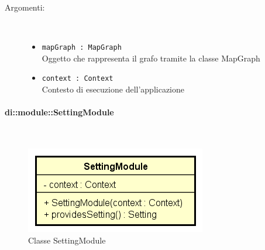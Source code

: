 \documentclass[../DefinizioneDiProdotto.tex]{subfiles}
\begin{document}
\begin{description}
\begin{itemize}
		\begin{description}
			\item[Argomenti:] \
			\begin{itemize}
				\item \texttt{mapGraph : MapGraph}\\
				Oggetto che rappresenta il grafo tramite la classe MapGraph\item \texttt{context : Context}\\
				Contesto di esecuzione dell'applicazione\end{itemize}
		\end{description}
	\end{itemize}
\end{description}

\paragraph{di::module::SettingModule}
\
\begin{figure}[H]
	\centering
	\includegraphics[width=\maxwidth]{img/SettingModule.png}
	\caption{Classe SettingModule}\label{fig:di::module::SettingModule} 
\end{figure}
\end{document}
